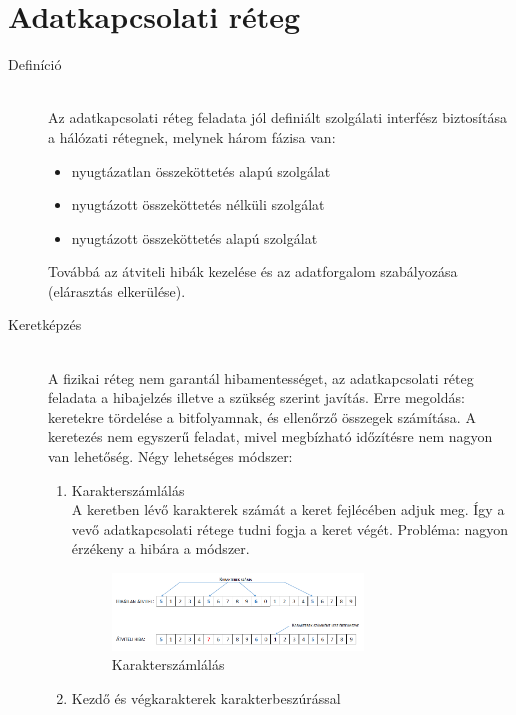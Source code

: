 \documentclass[margin=0px]{article}
\begin{document}
\section{Adatkapcsolati réteg}
\begin{description}
    \item[Definíció] \hfill \\
        Az adatkapcsolati réteg feladata jól definiált szolgálati interfész biztosítása a hálózati rétegnek, melynek három fázisa van:
        \begin{itemize}
            \item nyugtázatlan összeköttetés alapú szolgálat
            \item nyugtázott összeköttetés nélküli szolgálat
            \item nyugtázott összeköttetés alapú szolgálat
        \end{itemize}
        Továbbá az átviteli hibák kezelése és az adatforgalom szabályozása (elárasztás elkerülése).
    \item[Keretképzés] \hfill \\
        A fizikai réteg nem garantál hibamentességet, az adatkapcsolati réteg feladata a hibajelzés illetve a szükség szerint javítás. Erre megoldás: keretekre tördelése a bitfolyamnak, és ellenőrző összegek számítása. A keretezés nem egyszerű feladat, mivel megbízható időzítésre nem nagyon van lehetőség. Négy lehetséges módszer:
        \begin{enumerate}
            \item Karakterszámlálás \\
                  A keretben lévő karakterek számát a keret fejlécében adjuk meg. Így a vevő adatkapcsolati rétege tudni fogja a keret végét. Probléma: nagyon érzékeny a hibára a módszer.
                  \begin{figure}[H]
                      \centering
                      \includegraphics[width=0.7\textwidth]{img/karakterszamlalas.png}
                      \caption{Karakterszámlálás}
                  \end{figure}
            \item Kezdő és végkarakterek karakterbeszúrással \\

\end{enumerate}
\end{description}
\end{document}
